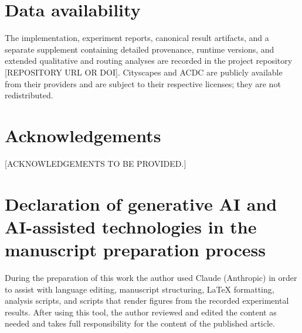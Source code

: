 \documentclass[a4paper,5p]{elsarticle}
\begin{document}
\section*{Data availability}

The implementation, experiment reports, canonical result artifacts, and a separate supplement containing detailed provenance, runtime versions, and extended qualitative and routing analyses are recorded in the project repository [REPOSITORY URL OR DOI]. Cityscapes and ACDC are publicly available from their providers and are subject to their respective licenses; they are not redistributed.

\section*{Acknowledgements}

[ACKNOWLEDGEMENTS TO BE PROVIDED.]

\section*{Declaration of generative AI and AI-assisted technologies in the manuscript preparation process}

During the preparation of this work the author used Claude (Anthropic) in order to assist with language editing, manuscript structuring, LaTeX formatting, analysis scripts, and scripts that render figures from the recorded experimental results. After using this tool, the author reviewed and edited the content as needed and takes full responsibility for the content of the published article.



\end{document}
